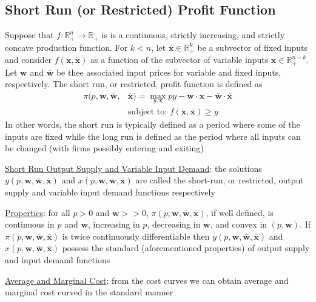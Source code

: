 \documentclass{article}
\begin{document}
\subsection{Short Run (or Restricted) Profit Function}
Suppose that $f: \mathbb{R}_{+}^{n} \rightarrow \mathbb{R}_{+}$ is is a continuous, strictly increasing, and strictly concave production function. For $k < n$, let $\overline{\mathbf{x}} \in \mathbb{R}_{+}^{k}$ be a subvector of fixed inputs and consider $f(\mathbf{x}, \overline{\mathbf{x}})$ as a function of the subvector of variable inputs $\mathbf{x} \in \mathbb{R}_{+}^{n-k}$. Let $\mathbf{w}$ and $\mathbf{\overline{w}}$ be thee associated input prices for variable and fixed inputs, respectively. The short run, or restricted, profit function is defined as
\begin{align*}
  \pi(p,\mathbf{w},\mathbf{\overline{w}},&\mathbf{\overline{x}}) = \max_{y, \mathbf{x}} py - \mathbf{w} \cdot \mathbf{x} - \mathbf{\overline{w}} \cdot \mathbf{\overline{x}} \\
  &\text{subject to: } f(\mathbf{x},\mathbf{\overline{x}}) \geq y
\end{align*}
In other words, the short run is typically defined as a period where some of the inputs are fixed while the long run is defined as the period where all inputs can be changed (with firms possibly entering and exiting)
\par \vspace{0.3em}
  \underline{Short Run Output Supply and Variable Input Demand}: the solutions $y(p, \mathbf{w}, \mathbf{\overline{w}}, \mathbf{\overline{x}})$ and $x(p, \mathbf{w}, \mathbf{\overline{w}}, \mathbf{\overline{x}})$ are called the short-run, or restricted, output supply and variable input demand functions respectively
  \par
  \underline{Properties}: for all $p > 0$ and $\mathbf{w} >> 0$,   $\pi(p,\mathbf{w},\mathbf{\overline{w}},\mathbf{\overline{x}})$, if well defined, is continuous in $p$ and $\mathbf{w}$, increasing in $p$, decreasing in $\mathbf{w}$, and convex in $(p, \mathbf{w})$. If $\pi(p,\mathbf{w},\mathbf{\overline{w}},\mathbf{\overline{x}})$ is twice continuously differentiable then $y(p, \mathbf{w}, \mathbf{\overline{w}}, \mathbf{\overline{x}})$ and $x(p, \mathbf{w}, \mathbf{\overline{w}}, \mathbf{\overline{x}})$ possess the standard (aforementioned properties) of output supply and input demand functions
  \par
  \underline{Average and Marginal Cost}: from the cost curves we can obtain average and marginal cost curved in the standard manner
\end{document}
